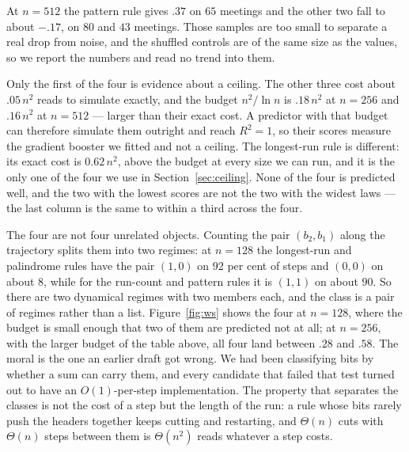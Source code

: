 \documentclass[11pt]{article}
\begin{document}
At $n=512$ the pattern rule gives $.37$ on $65$ meetings and the other two fall to about $-.17$, on
$80$ and $43$ meetings. Those samples are too small to separate a real drop from noise, and the
shuffled controls are of the same size as the values, so we report the numbers and read no trend
into them.

Only the first of the four is evidence about a ceiling. The other three cost about $.05\,n^2$ reads
to simulate exactly, and the budget $n^2/\ln n$ is $.18\,n^2$ at $n=256$ and $.16\,n^2$ at $n=512$
--- larger than their exact cost. A predictor with that budget can therefore simulate them
outright and reach $R^2=1$, so their scores measure the gradient booster we fitted and not a
ceiling. The longest-run rule is different: its exact cost is $0.62\,n^2$, above the budget at every
size we can run, and it is the only one of the four we use in Section~\ref{sec:ceiling}. None of the four is predicted well, and the two with the lowest scores are not the two with
the widest laws --- the last column is the same to within a third across the four.

The four are not four unrelated objects. Counting the pair $(b_2,b_1)$ along the trajectory splits
them into two regimes: at $n=128$ the longest-run and palindrome rules have the pair $(1,0)$ on $92$ per cent of
steps and $(0,0)$ on about $8$, while for the run-count and pattern rules it is $(1,1)$ on about $90$.
So there are two dynamical regimes with two members each, and the class is a pair of regimes rather
than a list. Figure~\ref{fig:ws} shows the four at $n=128$, where the budget is small enough that two of them are
predicted not at all; at $n=256$, with the larger budget of the table above, all four land between
$.28$ and $.58$. The moral is the one an earlier draft got wrong. We had been classifying bits by
whether a sum can
carry them, and every candidate that failed that test turned out to have an $O(1)$-per-step
implementation. The property that separates the classes is not the cost of a step but the length of
the run: a rule whose bits rarely push the headers together keeps cutting and restarting, and
$\Theta(n)$ cuts with $\Theta(n)$ steps between them is $\Theta(n^2)$ reads whatever a step costs.
\end{document}
